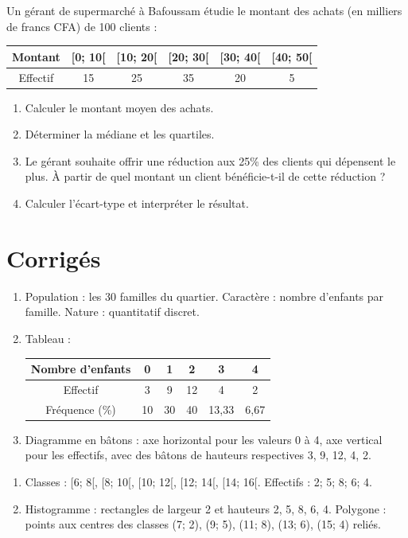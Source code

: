 Un gérant de supermarché à Bafoussam étudie le montant des achats (en milliers de francs CFA) de 100 clients :
\begin{center}
\begin{tabular}{|c|c|c|c|c|c|}
\hline
Montant & [0; 10[ & [10; 20[ & [20; 30[ & [30; 40[ & [40; 50[ \\
\hline
Effectif & 15 & 25 & 35 & 20 & 5 \\
\hline
\end{tabular}
\end{center}
\begin{enumerate}[label=\arabic*)]
\item Calculer le montant moyen des achats.
\item Déterminer la médiane et les quartiles.
\item Le gérant souhaite offrir une réduction aux 25\% des clients qui dépensent le plus. À partir de quel montant un client bénéficie-t-il de cette réduction ?
\item Calculer l'écart-type et interpréter le résultat.
\end{enumerate}

\section{Corrigés}

\begin{enumerate}[label=\alph*)]
\item Population : les 30 familles du quartier. Caractère : nombre d'enfants par famille. Nature : quantitatif discret.
\item Tableau :
\begin{center}
\begin{tabular}{|c|c|c|c|c|c|}
\hline
Nombre d'enfants & 0 & 1 & 2 & 3 & 4 \\
\hline
Effectif & 3 & 9 & 12 & 4 & 2 \\
\hline
Fréquence (\%) & 10 & 30 & 40 & 13,33 & 6,67 \\
\hline
\end{tabular}
\end{center}
\item Diagramme en bâtons : axe horizontal pour les valeurs 0 à 4, axe vertical pour les effectifs, avec des bâtons de hauteurs respectives 3, 9, 12, 4, 2.
\end{enumerate}

\begin{enumerate}[label=\alph*)]
\item Classes : [6; 8[, [8; 10[, [10; 12[, [12; 14[, [14; 16[. Effectifs : 2; 5; 8; 6; 4.
\item Histogramme : rectangles de largeur 2 et hauteurs 2, 5, 8, 6, 4. Polygone : points aux centres des classes (7; 2), (9; 5), (11; 8), (13; 6), (15; 4) reliés.
\end{enumerate}

